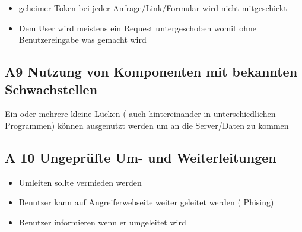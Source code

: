 \begin{itemize}
	\item geheimer Token bei jeder Anfrage/Link/Formular wird nicht mitgeschickt
	\item Dem User wird meistens ein Request untergeschoben womit ohne Benutzereingabe was gemacht wird
\end{itemize}

\subsection*{A9 Nutzung von Komponenten mit bekannten Schwachstellen}

 Ein oder mehrere kleine Lücken ( auch hintereinander in unterschiedlichen Programmen) können ausgenutzt werden um an die Server/Daten zu kommen
 
\subsection*{A 10 Ungeprüfte Um- und Weiterleitungen}

\begin{itemize}
	\item Umleiten sollte vermieden werden
	\item Benutzer kann auf Angreiferwebseite weiter geleitet werden ( Phising)
	\item Benutzer informieren wenn er umgeleitet wird
\end{itemize}
